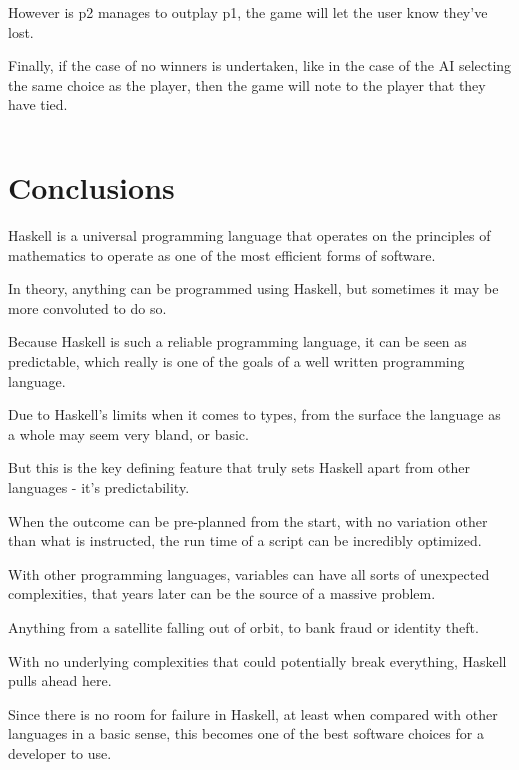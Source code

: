 \documentclass{article}
\begin{document}
\medskip\noindent
However is p2 manages to outplay p1, the game will let the user know they've lost.

\medskip\noindent
Finally, if the case of no winners is undertaken, like in the case of the AI selecting the same choice as the player, then the game will note to the player that they have tied. 

\medskip\noindent

\medskip\medskip
\begin{lstlisting}
\end{lstlisting}
\section{Conclusions}\label{conclusions}
\medskip\medskip
\hspace{\parindent} 

Haskell is a universal programming language that operates on the principles of mathematics to operate as one of the most efficient forms of software. 

\medskip\noindent
In theory, anything can be programmed using Haskell, but sometimes it may be more convoluted to do so. 

\medskip\noindent
Because Haskell is such a reliable programming language, it can be seen as predictable, which really is one of the goals of a well written programming language.

\medskip\noindent
Due to Haskell's limits when it comes to types, from the surface the language as a whole may seem very bland, or basic.

\medskip\noindent
But this is the key defining feature that truly sets Haskell apart from other languages - it's predictability. 

\medskip\noindent
When the outcome can be pre-planned from the start, with no variation other than what is instructed, the run time of a script can be incredibly optimized.

\medskip\noindent
With other programming languages, variables can have all sorts of unexpected complexities, that years later can be the source of a massive problem.

\medskip\noindent
Anything from a satellite falling out of orbit, to bank fraud or identity theft. 

\medskip\noindent
With no underlying complexities that could potentially break everything, Haskell pulls ahead here.

\medskip\noindent
Since there is no room for failure in Haskell, at least when compared with other languages in a basic sense, this becomes one of the best software choices for a developer to use.
\end{document}
